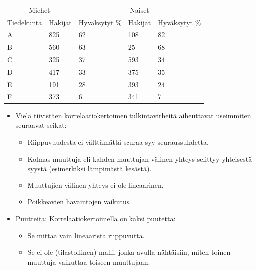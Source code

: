 \documentclass[
]{book}
\providecommand{\tightlist}{%
  \setlength{\itemsep}{0pt}\setlength{\parskip}{0pt}}
\begin{document}
\FloatBarrier

\begin{table}
\centering\begingroup\fontsize{12}{14}\selectfont

\begin{tabular}{lllll}
\toprule
\multicolumn{2}{c}{Miehet} & \multicolumn{3}{c}{Naiset} \\
\cmidrule(l{3pt}r{3pt}){1-2} \cmidrule(l{3pt}r{3pt}){3-5}
Tiedekunta & Hakijat & Hyväksytyt \% & Hakijat & Hyväksytyt \%\\
\midrule
A & 825 & 62 & 108 & 82\\
B & 560 & 63 & 25 & 68\\
C & 325 & 37 & 593 & 34\\
D & 417 & 33 & 375 & 35\\
E & 191 & 28 & 393 & 24\\
\addlinespace
F & 373 & 6 & 341 & 7\\
\bottomrule
\end{tabular}
\endgroup{}
\end{table}

\FloatBarrier

\begin{itemize}
\tightlist
\item
  Vielä tiivistäen korrelaatiokertoimen tulkintavirheitä aiheuttavat useimmiten seuraavat seikat:

  \begin{itemize}
  \tightlist
  \item
    Riippuvuudesta ei välttämättä seuraa syy-seuraussuhdetta.
  \item
    Kolmas muuttuja eli kahden muuttujan välinen yhteys selittyy yhteisestä syystä (esimerkiksi lämpimästä kesästä).
  \item
    Muuttujien välinen yhteys ei ole lineaarinen.
  \item
    Poikkeavien havaintojen vaikutus.
  \end{itemize}
\item
  Puutteita: Korrelaatiokertoimella on kaksi puutetta:

  \begin{itemize}
  \tightlist
  \item
    Se mittaa vain lineaarista riippuvutta.
  \item
    Se ei ole (tilastollinen) malli, jonka avulla nähtäisiin, miten toinen muuttuja vaikuttaa toiseen muuttujaan.
  \end{itemize}
\end{itemize}
\end{document}
